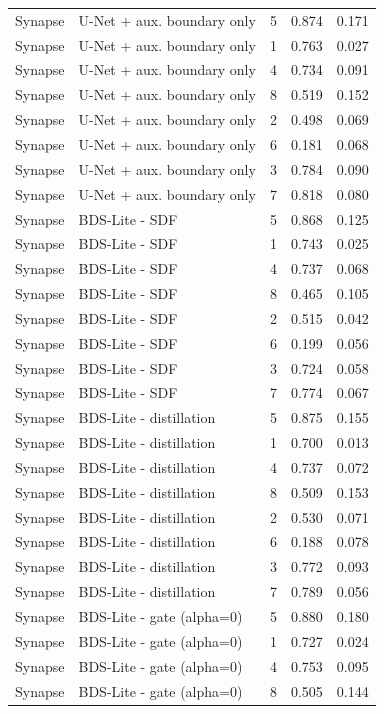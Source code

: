 \begin{tabular}{lllll}
Synapse & U-Net + aux. boundary only & 5 & 0.874 & 0.171 \\
Synapse & U-Net + aux. boundary only & 1 & 0.763 & 0.027 \\
Synapse & U-Net + aux. boundary only & 4 & 0.734 & 0.091 \\
Synapse & U-Net + aux. boundary only & 8 & 0.519 & 0.152 \\
Synapse & U-Net + aux. boundary only & 2 & 0.498 & 0.069 \\
Synapse & U-Net + aux. boundary only & 6 & 0.181 & 0.068 \\
Synapse & U-Net + aux. boundary only & 3 & 0.784 & 0.090 \\
Synapse & U-Net + aux. boundary only & 7 & 0.818 & 0.080 \\
Synapse & BDS-Lite - SDF & 5 & 0.868 & 0.125 \\
Synapse & BDS-Lite - SDF & 1 & 0.743 & 0.025 \\
Synapse & BDS-Lite - SDF & 4 & 0.737 & 0.068 \\
Synapse & BDS-Lite - SDF & 8 & 0.465 & 0.105 \\
Synapse & BDS-Lite - SDF & 2 & 0.515 & 0.042 \\
Synapse & BDS-Lite - SDF & 6 & 0.199 & 0.056 \\
Synapse & BDS-Lite - SDF & 3 & 0.724 & 0.058 \\
Synapse & BDS-Lite - SDF & 7 & 0.774 & 0.067 \\
Synapse & BDS-Lite - distillation & 5 & 0.875 & 0.155 \\
Synapse & BDS-Lite - distillation & 1 & 0.700 & 0.013 \\
Synapse & BDS-Lite - distillation & 4 & 0.737 & 0.072 \\
Synapse & BDS-Lite - distillation & 8 & 0.509 & 0.153 \\
Synapse & BDS-Lite - distillation & 2 & 0.530 & 0.071 \\
Synapse & BDS-Lite - distillation & 6 & 0.188 & 0.078 \\
Synapse & BDS-Lite - distillation & 3 & 0.772 & 0.093 \\
Synapse & BDS-Lite - distillation & 7 & 0.789 & 0.056 \\
Synapse & BDS-Lite - gate (alpha=0) & 5 & 0.880 & 0.180 \\
Synapse & BDS-Lite - gate (alpha=0) & 1 & 0.727 & 0.024 \\
Synapse & BDS-Lite - gate (alpha=0) & 4 & 0.753 & 0.095 \\
Synapse & BDS-Lite - gate (alpha=0) & 8 & 0.505 & 0.144 \\

\end{tabular}
